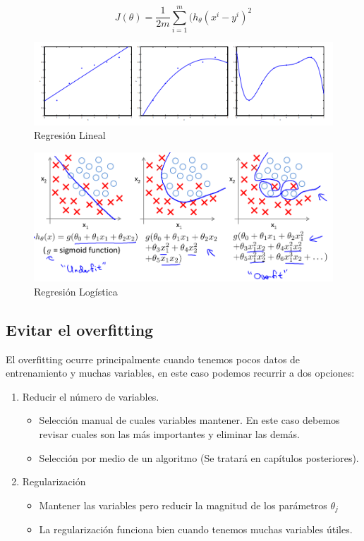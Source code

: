 \documentclass{report}
\begin{document}
	\begin{equation}
	J(\theta)=\frac{1}{2m}\sum_{i=1}^{m}(h_\theta(x^i-y^i)^2
	\label{eq:Hip}
	\end{equation} 
	\begin{figure}[h]
		\centering
		\includegraphics[scale=0.6]{img/overLR}
		\caption{Regresión Lineal}
		\label{Fig:overLR}
	\end{figure}
		\begin{figure}[h]
		\centering
		\includegraphics[scale=0.4]{img/overLogR}
		\caption{Regresión Logística}
		\label{Fig:overLogR}
	\end{figure}
\subsection{Evitar el overfitting}
El overfitting ocurre principalmente cuando tenemos pocos datos de entrenamiento y muchas variables, en este caso podemos recurrir a dos opciones:
\begin{enumerate}
	\item Reducir el número de variables.
	\begin{itemize}
		\item Selección manual de cuales variables mantener. En este caso debemos revisar cuales son las más importantes y eliminar las demás.
		\item Selección por medio de un algoritmo (Se tratará en capítulos posteriores).
	\end{itemize}
	\item Regularización
	\begin{itemize}
		\item Mantener las variables pero reducir la magnitud de los parámetros $ \theta_j $
		\item La regularización funciona bien cuando tenemos muchas variables útiles.
	\end{itemize}
\end{enumerate}
\end{document}
